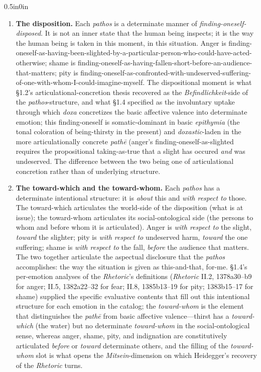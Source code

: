 \documentclass{article}
\begin{document}
\begin{adjustwidth}{0.5in}{0in}
    \begin{enumerate}
        \item \textbf{The disposition.} Each \textit{pathos} is a determinate manner of \textit{finding-oneself-disposed}. It is not an inner state that the human being inspects; it is the way the human being is taken in this moment, in this situation. Anger is finding-oneself-as-having-been-slighted-by-a-particular-person-who-could-have-acted-otherwise; shame is finding-oneself-as-having-fallen-short-before-an-audience-that-matters; pity is finding-oneself-as-confronted-with-undeserved-suffering-of-one-with-whom-I-could-imagine-myself. The dispositional moment is what \S1.2's articulational-concretion thesis recovered as the \textit{Befindlichkeit}-side of the \textit{pathos}-structure, and what \S1.4 specified as the involuntary uptake through which \textit{doxa} concretizes the basic affective valence into determinate emotion; this finding-oneself is somatic-dominant in basic \textit{epithymia} (the tonal coloration of being-thirsty in the present) and \textit{doxastic}-laden in the more articulationally concrete \textit{pathē} (anger's finding-oneself-as-slighted requires the propositional taking-as-true that a slight has occured \textit{and} was undeserved. The difference between the two being one of articulational concretion rather than of underlying structure.
        
        \item \textbf{The toward-which and the toward-whom.} Each \textit{pathos} has a determinate intentional structure: it is \textit{about} this and \textit{with respect to} those. The toward-which articulates the world-side of the disposition (what is at issue); the toward-whom articulates its social-ontological side (the persons to whom and before whom it is articulated). Anger is \textit{with respect to} the slight, \textit{toward} the slighter; pity is \textit{with respect to} undeserved harm, \textit{toward} the one suffering; shame is \textit{with respect to} the fall, \textit{before} the audience that matters. The two together articulate the aspectual disclosure that the \textit{pathos} accomplishes: the way the situation is given as this-and-that, for-me. \S1.4's per-emotion analyses of the \textit{Rhetoric}'s definitions (\textit{Rhetoric} II.2, 1378a30--b9 for anger; II.5, 1382a22--32 for fear; II.8, 1385b13--19 for pity; 1383b15--17 for shame) supplied the specific evaluative contents that fill out this intentional structure for each emotion in the catalog; the \textit{toward-whom} is the element that distinguishes the \textit{pathē} from basic affective valence---thirst has a \textit{toward-which} (the water) but no determinate \textit{toward-whom} in the social-ontological sense, whereas anger, shame, pity, and indignation are constitutively articulated \textit{before} or \textit{toward} determinate others, and the filling of the \textit{toward-whom} slot is what opens the \textit{Mitsein}-dimension on which Heidegger's recovery of the \textit{Rhetoric} turns.


\end{enumerate}
\end{adjustwidth}
\end{document}
